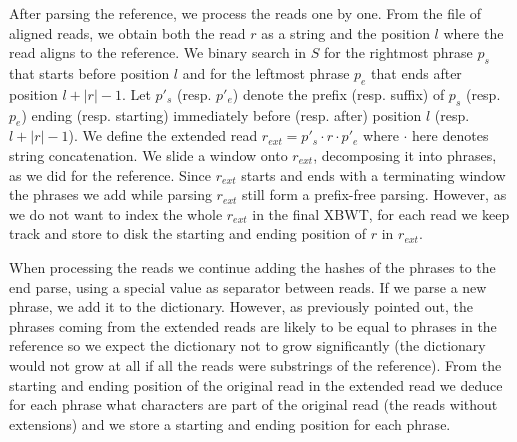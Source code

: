 



%


After parsing the reference, we process the reads one by one. 
From the file of aligned reads, we obtain both the read $r$ as a string and the position $l$ where the read aligns to the reference. 
We binary search in $S$ for the rightmost phrase $p_s$ that starts before position $l$ and for the leftmost phrase $p_e$ that ends after position $l+|r|-1$. Let $p'_s$ (resp. $p'_e$) denote the prefix (resp. suffix) of $p_s$ (resp. $p_e$) ending (resp. starting) immediately before (resp. after) position $l$ (resp. $l+|r|-1$). We define the extended read $r_{ext} = p'_s \cdot r \cdot p'_e$ where $\cdot$ here denotes string concatenation. We slide a window onto $r_{ext}$, decomposing it into phrases, as we did for the reference. Since $r_{ext}$ starts and ends with a terminating window the phrases we add while parsing $r_{ext}$ still form a prefix-free parsing.
%
However, as we do not want to index the whole $r_{ext}$ in the final XBWT, for each read we keep track and store to disk the starting and ending position of $r$ in $r_{ext}$. 



When processing the reads we continue adding the hashes of the phrases to the end parse, using a special value as separator between reads. If we parse a new phrase, we add it to the dictionary. However, as previously pointed out, the phrases coming from the extended reads are likely to be equal to phrases in the reference so we expect the dictionary not to grow significantly (the dictionary would not grow at all if all the reads were substrings of the reference). From the starting and ending position of the original read in the extended read we deduce for each phrase what characters are part of the original read (the reads without extensions) and we store a starting and ending position for each phrase.

